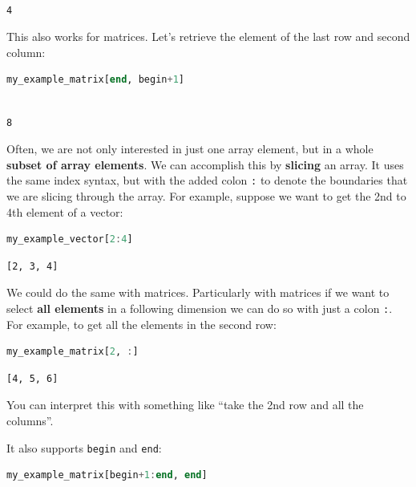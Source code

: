 \documentclass[
  notoc %
]{tufte-book}
\newcommand{\passthrough}[1]{#1}
\begin{document}
\begin{lstlisting}[language=Output]

4

\end{lstlisting}

This also works for matrices. Let's retrieve the element of the last row
and second column:

\begin{lstlisting}[language=Julia]
my_example_matrix[end, begin+1]
\end{lstlisting}

\begin{lstlisting}[language=Output]

8

\end{lstlisting}

Often, we are not only interested in just one array element, but in a
whole \textbf{subset of array elements}. We can accomplish this by
\textbf{slicing} an array. It uses the same index syntax, but with the
added colon \passthrough{\lstinline!:!} to denote the boundaries that we
are slicing through the array. For example, suppose we want to get the
2nd to 4th element of a vector:

\begin{lstlisting}[language=Julia]
my_example_vector[2:4]
\end{lstlisting}

\begin{lstlisting}[language=Output]
[2, 3, 4]
\end{lstlisting}

We could do the same with matrices. Particularly with matrices if we
want to select \textbf{all elements} in a following dimension we can do
so with just a colon \passthrough{\lstinline!:!}. For example, to get
all the elements in the second row:

\begin{lstlisting}[language=Julia]
my_example_matrix[2, :]
\end{lstlisting}

\begin{lstlisting}[language=Output]
[4, 5, 6]
\end{lstlisting}

You can interpret this with something like ``take the 2nd row and all
the columns''.

It also supports \passthrough{\lstinline!begin!} and
\passthrough{\lstinline!end!}:

\begin{lstlisting}[language=Julia]
my_example_matrix[begin+1:end, end]
\end{lstlisting}
\end{document}
